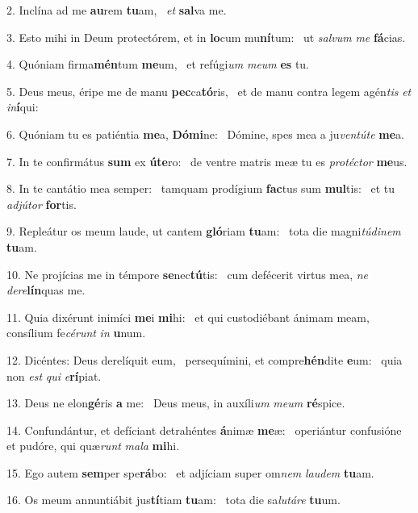 2. Inclína ad me \textbf{au}rem \textbf{tu}am, \ast\  \textit{et} \textbf{sal}va me.\

3. Esto mihi in Deum protectórem, et in \textbf{lo}cum mu\textbf{ní}tum: \ast\  ut \textit{sal}\textit{vum} \textit{me} \textbf{fá}cias.\

4. Quóniam firma\textbf{mén}tum \textbf{me}um, \ast\  et refúgi\textit{um} \textit{me}\textit{um} \textbf{es} tu.\

5. Deus meus, éripe me de manu \textbf{pec}ca\textbf{tó}ris, \ast\  et de manu contra legem agén\textit{tis} \textit{et} \textit{in}\textbf{í}qui:\

6. Quóniam tu es patiéntia \textbf{me}a, \textbf{Dó}\textbf{mi}ne: \ast\  Dómine, spes mea a ju\textit{ven}\textit{tú}\textit{te} \textbf{me}a.\

7. In te confirmátus \textbf{sum} ex \textbf{ú}\textbf{te}ro: \ast\  de ventre matris meæ tu es \textit{pro}\textit{téc}\textit{tor} \textbf{me}us.\

8. In te cantátio mea semper: \dag\  tamquam prodígium \textbf{fac}tus sum \textbf{mul}tis: \ast\  et tu \textit{ad}\textit{jú}\textit{tor} \textbf{for}tis.\

9. Repleátur os meum laude, ut cantem \textbf{gló}riam \textbf{tu}am: \ast\  tota die magni\textit{tú}\textit{di}\textit{nem} \textbf{tu}am.\

10. Ne projícias me in témpore \textbf{se}nec\textbf{tú}tis: \ast\  cum defécerit virtus mea, \textit{ne} \textit{de}\textit{re}\textbf{lín}quas me.\

11. Quia dixérunt inimíci \textbf{me}i \textbf{mi}hi: \ast\  et qui custodiébant ánimam meam, consílium fe\textit{cé}\textit{runt} \textit{in} \textbf{u}num.\

12. Dicéntes: Deus derelíquit eum, \dag\  persequímini, et compre\textbf{hén}dite \textbf{e}um: \ast\  quia non \textit{est} \textit{qui} \textit{e}\textbf{rí}piat.\

13. Deus ne elon\textbf{gé}ris \textbf{a} me: \ast\  Deus meus, in auxíli\textit{um} \textit{me}\textit{um} \textbf{ré}spice.\

14. Confundántur, et defíciant detrahéntes \textbf{á}nimæ \textbf{me}æ: \ast\  operiántur confusióne et pudóre, qui quæ\textit{runt} \textit{ma}\textit{la} \textbf{mi}hi.\

15. Ego autem \textbf{sem}per spe\textbf{rá}bo: \ast\  et adjíciam super om\textit{nem} \textit{lau}\textit{dem} \textbf{tu}am.\

16. Os meum annuntiábit jus\textbf{tí}tiam \textbf{tu}am: \ast\  tota die sa\textit{lu}\textit{tá}\textit{re} \textbf{tu}um.\

